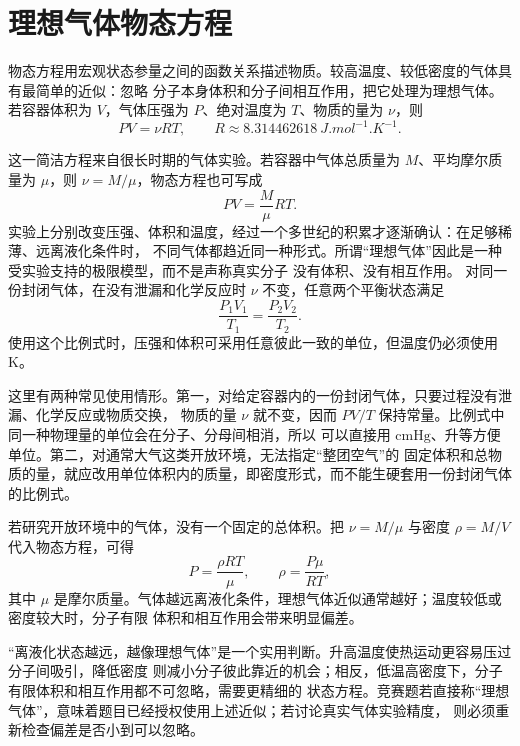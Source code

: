 {\section{理想气体物态方程}\label{ch14:sec:ideal-gas}

物态方程用宏观状态参量之间的函数关系描述物质。较高温度、较低密度的气体具有最简单的近似：忽略
分子本身体积和分子间相互作用，把它处理为理想气体。若容器体积为 $V$，气体压强为 $P$、绝对温度为
$T$、物质的量为 $\nu$，则
\begin{equation}
  \boxed{PV=\nu RT},
  \qquad R\approx\SI{8.314462618}{J.mol^{-1}.K^{-1}}.
\end{equation}

这一简洁方程来自很长时期的气体实验。若容器中气体总质量为 $M$、平均摩尔质量为 $\mu$，则
$\nu=M/\mu$，物态方程也可写成
\begin{equation}
  PV=\frac{M}{\mu}RT.
\end{equation}
实验上分别改变压强、体积和温度，经过一个多世纪的积累才逐渐确认：在足够稀薄、远离液化条件时，
不同气体都趋近同一种形式。所谓“理想气体”因此是一种受实验支持的极限模型，而不是声称真实分子
没有体积、没有相互作用。
对同一份封闭气体，在没有泄漏和化学反应时 $\nu$ 不变，任意两个平衡状态满足
\begin{equation}
  \boxed{\frac{P_1V_1}{T_1}=\frac{P_2V_2}{T_2}}.
\end{equation}
使用这个比例式时，压强和体积可采用任意彼此一致的单位，但温度仍必须使用 K。

这里有两种常见使用情形。第一，对给定容器内的一份封闭气体，只要过程没有泄漏、化学反应或物质交换，
物质的量 $\nu$ 就不变，因而 $PV/T$ 保持常量。比例式中同一种物理量的单位会在分子、分母间相消，所以
可以直接用 $\mathrm{cmHg}$、升等方便单位。第二，对通常大气这类开放环境，无法指定“整团空气”的
固定体积和总物质的量，就应改用单位体积内的质量，即密度形式，而不能生硬套用一份封闭气体的比例式。

若研究开放环境中的气体，没有一个固定的总体积。把 $\nu=M/\mu$ 与密度 $\rho=M/V$ 代入物态方程，可得
\begin{equation}
  \boxed{P=\frac{\rho RT}{\mu}},
  \qquad
  \boxed{\rho=\frac{P\mu}{RT}},
\end{equation}
其中 $\mu$ 是摩尔质量。气体越远离液化条件，理想气体近似通常越好；温度较低或密度较大时，分子有限
体积和相互作用会带来明显偏差。

“离液化状态越远，越像理想气体”是一个实用判断。升高温度使热运动更容易压过分子间吸引，降低密度
则减小分子彼此靠近的机会；相反，低温高密度下，分子有限体积和相互作用都不可忽略，需要更精细的
状态方程。竞赛题若直接称“理想气体”，意味着题目已经授权使用上述近似；若讨论真实气体实验精度，
则必须重新检查偏差是否小到可以忽略。

}
